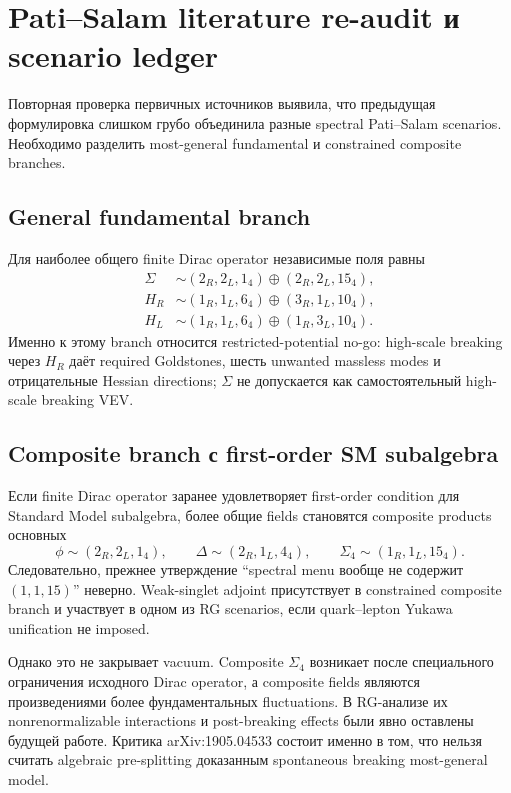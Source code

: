 \chapter{Pati--Salam literature re-audit и scenario ledger}

Повторная проверка первичных источников выявила, что предыдущая формулировка
слишком грубо объединила разные spectral Pati--Salam scenarios. Необходимо
разделить most-general fundamental и constrained composite branches.

\section{General fundamental branch}

Для наиболее общего finite Dirac operator независимые поля равны
\begin{align}
 \Sigma&\sim(2_R,2_L,1_4)\oplus(2_R,2_L,15_4),\\
 H_R&\sim(1_R,1_L,6_4)\oplus(3_R,1_L,10_4),\\
 H_L&\sim(1_R,1_L,6_4)\oplus(1_R,3_L,10_4).
\end{align}
Именно к этому branch относится restricted-potential no-go: high-scale
breaking через \(H_R\) даёт required Goldstones, шесть unwanted massless
modes и отрицательные Hessian directions; \(\Sigma\) не допускается как
самостоятельный high-scale breaking VEV.

\section{Composite branch с first-order SM subalgebra}

Если finite Dirac operator заранее удовлетворяет first-order condition для
Standard Model subalgebra, более общие fields становятся composite products
основных
\begin{equation}
 \phi\sim(2_R,2_L,1_4),
 \qquad
 \Delta\sim(2_R,1_L,4_4),
 \qquad
 \Sigma_4\sim(1_R,1_L,15_4).
\end{equation}
Следовательно, прежнее утверждение ``spectral menu вообще не содержит
\((1,1,15)\)'' неверно. Weak-singlet adjoint присутствует в constrained
composite branch и участвует в одном из RG scenarios, если quark--lepton
Yukawa unification не imposed.

Однако это не закрывает vacuum. Composite \(\Sigma_4\) возникает после
специального ограничения исходного Dirac operator, а composite fields
являются произведениями более фундаментальных fluctuations. В RG-анализе
их nonrenormalizable interactions и post-breaking effects были явно
оставлены будущей работе. Критика arXiv:1905.04533 состоит именно в том, что
нельзя считать algebraic pre-splitting доказанным spontaneous breaking
most-general model.

